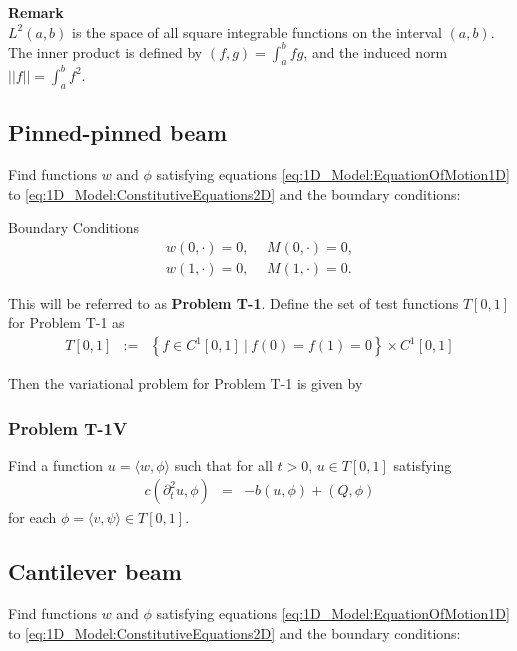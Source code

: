				\textbf{Remark}\\
				$L^2(a,b)$ is the space of all square integrable functions on the interval $(a,b)$. The inner product is defined by $\displaystyle (f,g) = \int_a^b fg$, and the induced norm $\displaystyle ||f|| = \int_a^b f^2$.\\

			\subsection*{Pinned-pinned beam}
				Find functions $w$ and $\phi$ satisfying equations \eqref{eq:1D_Model:EquationOfMotion1D} to \eqref{eq:1D_Model:ConstitutiveEquations2D} and the boundary conditions:

				{Boundary Conditions}\\
				\begin{eqnarray*}
					w(0,\cdot) = 0, \ \ &M(0,\cdot) = 0, \label{eq:1D_Model:ProblemT1BC1}\\
					w(1,\cdot) = 0, \ \ &M(1,\cdot) = 0. \label{eq:1D_Model:ProblemT1BC2}
				\end{eqnarray*}

				This will be referred to as \textbf{Problem T-1}. Define the set of test functions $T[0,1]$ for Problem T-1 as
				\begin{eqnarray*}
					T[0,1] &:=&  \left\{f \in C^1[0,1] \ | \ f(0) = f(1) = 0 \right\} \times C^1[0,1]
				\end{eqnarray*}

				Then the variational problem for Problem T-1 is given by
				\subsubsection*{Problem T-1V}\label{sssec:1D_Model:ProblemT1V}
					Find a function ${u} = \langle w, \phi \rangle$ such that for all $t >0$, ${u} \in  T[0,1]$ satisfying
					\begin{eqnarray}
						c(\partial_t^2 u,{\phi}) &=& -b({u},{\phi}) + (Q,{\phi})
					\end{eqnarray} for each ${\phi} = \langle v, \psi \rangle \in T[0,1]$.

			\subsection*{Cantilever beam}
				Find functions $w$ and $\phi$ satisfying equations \eqref{eq:1D_Model:EquationOfMotion1D} to \eqref{eq:1D_Model:ConstitutiveEquations2D} and the boundary conditions:

